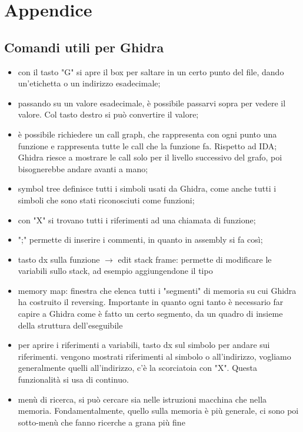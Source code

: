 \documentclass[12pt, oneside]{extbook}
\begin{document}
\newpage
\chapter*{Appendice}
\section*{Comandi utili per Ghidra}
\begin{itemize}
\item con il tasto "G" si apre il box per saltare in un certo punto del file, dando un'etichetta o un indirizzo esadecimale;
\item passando su un valore esadecimale, è possibile passarvi sopra per vedere il valore. Col tasto destro si può convertire il valore;
\item è possibile richiedere un call graph, che rappresenta con ogni punto una funzione e rappresenta tutte le call che la funzione fa. Rispetto ad IDA; Ghidra riesce a mostrare le call solo per il livello successivo del grafo, poi bisognerebbe andare avanti a mano;
\item symbol tree definisce tutti i simboli usati da Ghidra, come anche tutti i simboli che sono stati riconosciuti come funzioni;
\item con "X" si trovano tutti i riferimenti ad una chiamata di funzione;
\item ";" permette di inserire i commenti, in quanto in assembly si fa così;
\item tasto dx sulla funzione $\rightarrow$ edit stack frame: permette di modificare le variabili sullo stack, ad esempio aggiungendone il tipo
\item memory map: finestra che elenca tutti i "segmenti" di memoria su cui Ghidra ha costruito il reversing. Importante in quanto ogni tanto è necessario far capire a Ghidra come è fatto un certo segmento, da un quadro di insieme della struttura dell'eseguibile
\item per aprire i riferimenti a variabili, tasto dx sul simbolo per andare sui riferimenti. vengono mostrati riferimenti al simbolo o all'indirizzo, vogliamo generalmente quelli all'indirizzo, c'è la scorciatoia con "X". Questa funzionalità si usa di continuo.
\item menù di ricerca, si può cercare sia nelle istruzioni macchina che nella memoria. Fondamentalmente, quello sulla memoria è più generale, ci sono poi sotto-menù che fanno ricerche a grana più fine
\end{itemize}
\end{document}
